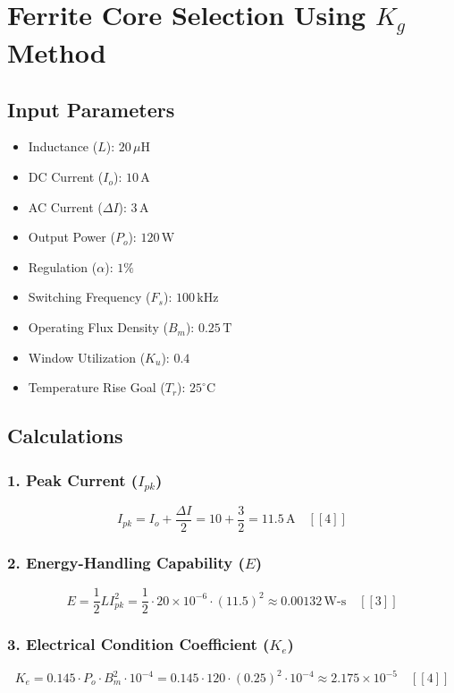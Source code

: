 \documentclass{article}
\begin{document}
	
	\section*{Ferrite Core Selection Using \(K_g\) Method}
	
	\subsection*{Input Parameters}
	\begin{itemize}
		\item Inductance (\(L\)): \(20 \, \mu\text{H}\)
		\item DC Current (\(I_o\)): \(10 \, \text{A}\)
		\item AC Current (\(\Delta I\)): \(3 \, \text{A}\)
		\item Output Power (\(P_o\)): \(120 \, \text{W}\)
		\item Regulation (\(\alpha\)): \(1\%\) 
		\item Switching Frequency (\(F_s\)): \(100 \, \text{kHz}\)
		\item Operating Flux Density (\(B_m\)): \(0.25 \, \text{T}\)
		\item Window Utilization (\(K_u\)): \(0.4\)
		\item Temperature Rise Goal (\(T_r\)): \(25^\circ\text{C}\)
	\end{itemize}
	
	\subsection*{Calculations}
	
	\subsubsection*{1. Peak Current (\(I_{pk}\))}
	\[
	I_{pk} = I_o + \frac{\Delta I}{2} = 10 + \frac{3}{2} = \boxed{11.5 \, \text{A}} \quad [[4]]
	\]
	
	\subsubsection*{2. Energy-Handling Capability (\(E\))}
	\[
	E = \frac{1}{2} L I_{pk}^2 = \frac{1}{2} \cdot 20 \times 10^{-6} \cdot (11.5)^2 \approx \boxed{0.00132 \, \text{W-s}} \quad [[3]]
	\]
	
	\subsubsection*{3. Electrical Condition Coefficient (\(K_e\))}
	\[
	K_e = 0.145 \cdot P_o \cdot B_m^2 \cdot 10^{-4} = 0.145 \cdot 120 \cdot (0.25)^2 \cdot 10^{-4} \approx \boxed{2.175 \times 10^{-5}} \quad [[4]]
	\]
	
\end{document}
